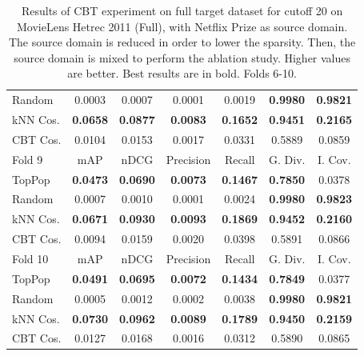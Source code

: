 \begin{table}[hbt]
\begin{tabulary}{\textwidth}{|L|CCCCCC|}
Random & 0.0003 &           0.0007 &           0.0001 &           0.0019 &                                  \textbf{0.9980} &                                   \textbf{0.9821} \\
kNN Cos. & \textbf{0.0658} &  \textbf{0.0877} &  \textbf{0.0083} &  \textbf{0.1652} &                                  \textbf{0.9451} &                                   \textbf{0.2165} \\
CBT Cos. & 0.0104 &           0.0153 &           0.0017 &           0.0331 &                                           0.5889 &                                            0.0859 \\
\hline
\hline
Fold 9 & mAP & nDCG & Precision & Recall & G. Div. & I. Cov. \\
\hline
TopPop & \textbf{0.0473} &  \textbf{0.0690} &  \textbf{0.0073} &  \textbf{0.1467} &                                  \textbf{0.7850} &                                            0.0378 \\
Random & 0.0007 &           0.0010 &           0.0001 &           0.0024 &                                  \textbf{0.9980} &                                   \textbf{0.9823} \\
kNN Cos. & \textbf{0.0671} &  \textbf{0.0930} &  \textbf{0.0093} &  \textbf{0.1869} &                                  \textbf{0.9452} &                                   \textbf{0.2160} \\
CBT Cos. & 0.0094 &           0.0159 &           0.0020 &           0.0398 &                                           0.5891 &                                            0.0866 \\
\hline
\hline
Fold 10 & mAP & nDCG & Precision & Recall & G. Div. & I. Cov. \\
\hline
TopPop & \textbf{0.0491} &  \textbf{0.0695} &  \textbf{0.0072} &  \textbf{0.1434} &                                  \textbf{0.7849} &                                            0.0377 \\
Random & 0.0005 &           0.0012 &           0.0002 &           0.0038 &                                  \textbf{0.9980} &                                   \textbf{0.9821} \\
kNN Cos. & \textbf{0.0730} &  \textbf{0.0962} &  \textbf{0.0089} &  \textbf{0.1789} &                                  \textbf{0.9450} &                                   \textbf{0.2159} \\
CBT Cos. & 0.0127 &           0.0168 &           0.0016 &           0.0312 &                                           0.5890 &                                            0.0865 \\
\hline
\end{tabulary}
\caption{Results of CBT experiment on full target dataset for cutoff 20 on MovieLens Hetrec 2011 (Full), with Netflix Prize as source domain. The source domain is reduced in order to lower the sparsity. Then, the source domain is mixed to perform the ablation study. Higher values are better. Best results are in bold. Folds 6-10.}
\end{table}

